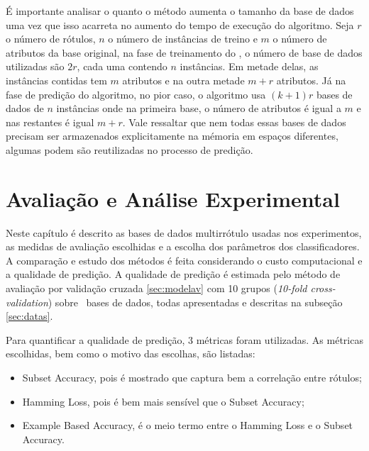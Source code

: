 É importante analisar o quanto o método aumenta o tamanho da base de dados uma vez que isso acarreta no aumento
do tempo de execução do algoritmo. Seja $r$ o número de rótulos, $n$ o número de instâncias de treino
e $m$ o número de atributos da base original, na fase de treinamento do \MRLMa, o número de base de dados utilizadas são
$2r$, cada uma contendo $n$ instâncias. Em metade delas, as instâncias contidas tem $m$ atributos e na outra metade $m+r$ atributos.
Já na fase de predição do algoritmo, no pior caso, o algoritmo usa $(k+1)r$ bases de dados de $n$ instâncias onde na primeira base, o
número de atributos é igual a $m$ e nas restantes é igual $m+r$. Vale ressaltar que nem todas essas bases de dados precisam ser
armazenados explicitamente na mémoria em espaços diferentes, algumas podem são reutilizadas no processo de predição.





\chapter{Avaliação e Análise Experimental}
Neste capítulo é descrito as bases de dados multirrótulo usadas nos experimentos, as medidas de avaliação escolhidas e a escolha
dos parâmetros dos classificadores. 
A comparação e estudo dos métodos é feita considerando o custo computacional e a qualidade de predição.
A qualidade de predição é estimada pelo método de avaliação por validação cruzada \ref{sec:modelav} com 10 grupos
(\textit{10-fold cross-validation}) sobre \Nbases~bases de dados, todas apresentadas e descritas na subseção \ref{sec:datas}.

Para quantificar a qualidade de predição, 3 métricas foram utilizadas.
As métricas escolhidas, bem como o motivo das escolhas,
são listadas:
\begin{itemize}
 \item Subset Accuracy, pois é mostrado que captura bem a correlação entre rótulos;
 \item Hamming Loss, pois é bem mais sensível que o Subset Accuracy;
 \item Example Based Accuracy, é o meio termo entre o Hamming Loss e o Subset Accuracy.
\end{itemize}

